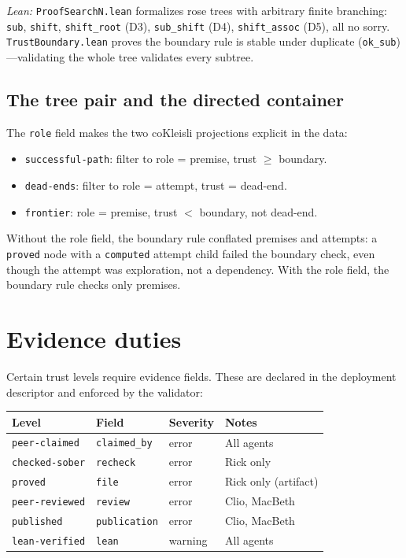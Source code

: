 \documentclass[11pt,a4paper]{article}
\newcommand{\level}[1]{\texttt{#1}}
\newcommand{\field}[1]{\texttt{#1}}
\theoremstyle{plain}
\theoremstyle{definition}
\begin{document}
\emph{Lean:} \texttt{ProofSearchN.lean} formalizes rose trees with
arbitrary finite branching: \texttt{sub}, \texttt{shift},
\texttt{shift\_root} (D3), \texttt{sub\_shift} (D4),
\texttt{shift\_assoc} (D5), all no sorry.
\texttt{TrustBoundary.lean} proves the boundary rule is stable under
$\mathrm{duplicate}$ (\texttt{ok\_sub})---validating the whole tree
validates every subtree.

\subsection{The tree pair and the directed container}

The \field{role} field makes the two coKleisli projections explicit in
the data:
\begin{itemize}
\item \texttt{successful-path}: filter to role = premise, trust $\geq$ boundary.
\item \texttt{dead-ends}: filter to role = attempt, trust = dead-end.
\item \texttt{frontier}: role = premise, trust $<$ boundary, not dead-end.
\end{itemize}

Without the role field, the boundary rule conflated premises and
attempts: a \level{proved} node with a \level{computed} attempt child
failed the boundary check, even though the attempt was exploration, not
a dependency. With the role field, the boundary rule checks only premises.

\section{Evidence duties}
\label{sec:evidence}

Certain trust levels require evidence fields. These are declared in the
deployment descriptor and enforced by the validator:

\begin{center}
\begin{tabular}{llll}
\toprule
Level & Field & Severity & Notes \\
\midrule
\level{peer-claimed} & \field{claimed\_by} & error & All agents \\
\level{checked-sober} & \field{recheck} & error & Rick only \\
\level{proved} & \field{file} & error & Rick only (artifact) \\
\level{peer-reviewed} & \field{review} & error & Clio, MacBeth \\
\level{published} & \field{publication} & error & Clio, MacBeth \\
\level{lean-verified} & \field{lean} & warning & All agents \\
\bottomrule
\end{tabular}
\end{center}
\end{document}
